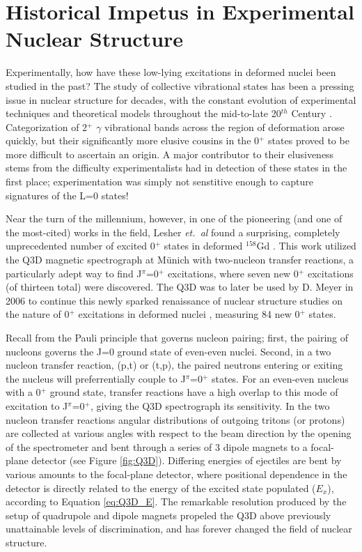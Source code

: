 
\section{Historical Impetus in Experimental Nuclear Structure}\label{sec:study_of_0plus}
Experimentally, how have these low-lying excitations in deformed nuclei been studied in the past? The study of collective vibrational states has been a pressing issue in nuclear structure for decades, with the constant evolution of experimental techniques and theoretical models throughout the mid-to-late 20$^{th}$ Century \cite{Casten_text,PhysRevC.54.679,KORTEN_1993}. Categorization of 2$^+$ $\gamma$ vibrational bands across the region of deformation arose quickly, but their significantly more elusive cousins in the 0$^+$ states proved to be more difficult to ascertain an origin. A major contributor to their elusiveness stems from the difficulty experimentalists had in detection of these states in the first place; experimentation was simply not senstitive enough to capture signatures of the L=0 states! 

Near the turn of the millennium, however, in one of the pioneering (and one of the most-cited) works in the field, Lesher \textit{et.~al} found a surprising, completely unprecedented number of excited 0$^+$ states in deformed $^{158}$Gd \cite{Lesher_158Gdpt}. This work utilized the Q3D magnetic spectrograph at M\"{u}nich with two-nucleon transfer reactions, a particularly adept way to find J$^\pi$=0$^+$ excitations, where seven new 0$^+$ excitations (of thirteen total) were discovered. The Q3D was to later be used by D. Meyer in 2006 to continue this newly sparked renaissance of nuclear structure studies on the nature of 0$^+$ excitations in deformed nuclei \cite{Meyer_pt0_2006}, measuring 84 new 0$^+$ states. 

Recall from \cite{Rowe_Wood_text} the Pauli principle that governs nucleon pairing; first, the pairing of nucleons governs the J=0 ground state of even-even nuclei. Second, in a two nucleon transfer reaction, (p,t) or (t,p), the paired neutrons entering or exiting the nucleus will preferrentially couple to J$^\pi$=0$^+$ states. For an even-even nucleus with a 0$^+$ ground state, transfer reactions have a high overlap to this mode of excitation to J$^\pi$=0$^+$, giving the Q3D spectrograph its sensitivity. In the two nucleon transfer reactions angular distributions of outgoing tritons (or protons) are collected at various angles with respect to the beam direction by the opening of the spectrometer and bent through a series of 3 dipole magnets to a focal-plane detector (see Figure \ref{fig:Q3D}). Differing energies of ejectiles are bent by various amounts to the focal-plane detector, where positional dependence in the detector is directly related to the energy of the excited state populated ($E_x$), according to Equation \ref{eq:Q3D_E}. The remarkable resolution produced by the setup of quadrupole and dipole magnets propeled the Q3D above previously unattainable levels of discrimination, and has forever changed the field of nuclear structure.

